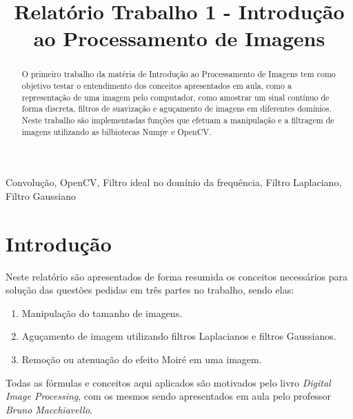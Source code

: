 \documentclass[conference]{IEEEtran}
\begin{document}
\title{Relatório Trabalho 1 - Introdução ao Processamento de Imagens
}

\author{
}

\maketitle

\begin{abstract}
O primeiro trabalho da matéria de Introdução ao Processamento de Imagens tem como objetivo testar o entendimento dos conceitos apresentados em aula, como a representação de uma imagem pelo computador, 
como amostrar um sinal contínuo de forma discreta, filtros de suavização e aguçamento de imagens em diferentes domínios. Neste trabalho são implementadas funções que efetuam a manipulação e a filtragem de imagens utilizando as bilbiotecas Numpy e OpenCV.
\end{abstract}

\begin{IEEEkeywords}
Convolução, OpenCV, Filtro ideal no domínio da frequência, Filtro Laplaciano, Filtro Gaussiano
\end{IEEEkeywords}

\section{Introdução}
Neste relatório são apresentados de forma resumida os conceitos necessários para solução
das questões pedidas em três partes no trabalho, sendo elas:
\begin{enumerate}
    \item Manipulação do tamanho de imagens.
    \item Aguçamento de imagem utilizando filtros Laplacianos e filtros Gaussianos.
    \item Remoção ou atenuação do efeito Moiré em uma imagem.
\end{enumerate} 
Todas as fórmulas e conceitos aqui aplicados são motivados pelo livro \textit{Digital Image Processing}\cite{gonzalez_digital_2017}, com os mesmos sendo apresentados em aula pelo professor \textit{Bruno Macchiavello}.
\end{document}
